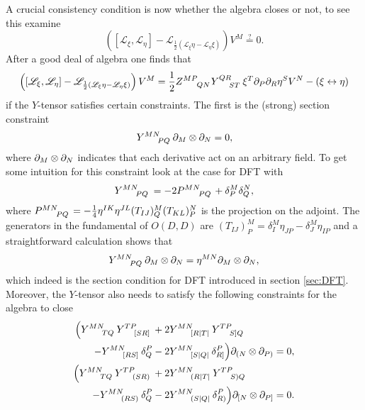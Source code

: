 A crucial consistency condition is now whether the algebra closes or not, to see this examine 
\begin{equation}\label{eq:closure}
    \left(\left[\mathscr{L}_\xi,\mathscr{L}_\eta\right]-\mathscr{L}_{\frac{1}{2}\left(\mathscr{L}_\xi\eta-\mathscr{L}_\eta\xi\right)}\right)V^M\overset{?}{=}0.
\end{equation}
After a good deal of algebra one finds that 
\begin{equation}\label{eq:GenDiffComm}
    \left(\left[\mathscr{L}_\xi,\mathscr{L}_\eta\right]-\mathscr{L}_{\frac{1}{2}\left(\mathscr{L}_\xi\eta-\mathscr{L}_\eta\xi\right)}\right)V^M = \frac{1}{2}\tensor{Z}{^{MP}_{QN}}\tensor{Y}{^{QR}_{ST}}\xi^T\pd_P\pd_R\eta^SV^N-\left(\xi\leftrightarrow\eta\right)
\end{equation}
if the $Y$-tensor satisfies certain constraints. The first is the (strong) section constraint 
\begin{equation}
    \tensor{Y}{^{MN}_{PQ}}\pd_M\otimes\pd_N = 0,
\end{equation}
where $\partial_M\otimes\partial_N$ indicates that each derivative act on an arbitrary field. To get some intuition for this constraint look at the case for DFT with
\begin{equation}
    \tensor{Y}{^{MN}_{PQ}}=-2\tensor{P}{^{MN}_{PQ}}+\delta^M_P\delta^N_Q,
\end{equation}
where $\tensor{P}{^{MN}_{PQ}}=-\frac{1}{4}\eta^{IK}\eta^{JL}(T_{IJ})^M_Q(T_{KL})^N_P$ is the projection on the adjoint. The generators in the fundamental of $O(D,D)$ \cite{Berman2014} are $(T_{IJ})^M_P=\delta^M_I\eta_{JP}-\delta_J^M\eta_{IP}$ and a straightforward calculation shows that 
\begin{equation}\label{eq:section}
    \tensor{Y}{^{MN}_{PQ}}\pd_M\otimes\pd_N = \eta^{MN}\pd_M\otimes\pd_N,
\end{equation}
which indeed is the section condition for DFT introduced in section \ref{sec:DFT}. Moreover, the $Y$-tensor also needs to satisfy the following constraints for the algebra to close
\begin{subequations}
    \begin{align}
        \begin{split}
        \Big(\tensor{Y}{^{MN}_{TQ}}\tensor{Y}{^{TP}_{[SR]}}&+2\tensor{Y}{^{MN}_{[R|T|}}\tensor{Y}{^{TP}_{S]Q}}\\
        -\tensor{Y}{^{MN}_{[RS]}}\delta^P_Q&-2\tensor{Y}{^{MN}_{[S|Q|}}\delta_{R]}^P\Big)\pd_{(N}\otimes\pd_{P)}=0,
        \end{split}\label{eq:closure1}
        \\
        \begin{split}
        \Big(\tensor{Y}{^{MN}_{TQ}}\tensor{Y}{^{TP}_{(SR)}}&+2\tensor{Y}{^{MN}_{(R|T|}}\tensor{Y}{^{TP}_{S)Q}}\\
        -\tensor{Y}{^{MN}_{(RS)}}\delta^P_Q&-2\tensor{Y}{^{MN}_{(S|Q|}}\delta_{R)}^P\Big)\pd_{[N}\otimes\pd_{P]}=0.
        \end{split}\label{eq:closure2}
    \end{align}
    \end{subequations}

